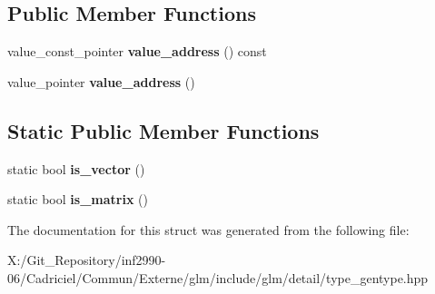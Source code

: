 \subsection*{Public Member Functions}
\begin{DoxyCompactItemize}
\item 
\hypertarget{structglm_1_1detail_1_1gen_type_a63fb77e77082f34c0a0d7faa0906f7f4}{value\-\_\-const\-\_\-pointer {\bfseries value\-\_\-address} () const }\label{structglm_1_1detail_1_1gen_type_a63fb77e77082f34c0a0d7faa0906f7f4}

\item 
\hypertarget{structglm_1_1detail_1_1gen_type_a146973ec142766743080c1895a9e3c65}{value\-\_\-pointer {\bfseries value\-\_\-address} ()}\label{structglm_1_1detail_1_1gen_type_a146973ec142766743080c1895a9e3c65}

\end{DoxyCompactItemize}
\subsection*{Static Public Member Functions}
\begin{DoxyCompactItemize}
\item 
\hypertarget{structglm_1_1detail_1_1gen_type_ae83087df55201bdc46a37decf3d1c34c}{static bool {\bfseries is\-\_\-vector} ()}\label{structglm_1_1detail_1_1gen_type_ae83087df55201bdc46a37decf3d1c34c}

\item 
\hypertarget{structglm_1_1detail_1_1gen_type_a78c650375558d5e2ccfba383cdb59479}{static bool {\bfseries is\-\_\-matrix} ()}\label{structglm_1_1detail_1_1gen_type_a78c650375558d5e2ccfba383cdb59479}

\end{DoxyCompactItemize}


The documentation for this struct was generated from the following file\-:\begin{DoxyCompactItemize}
\item 
X\-:/\-Git\-\_\-\-Repository/inf2990-\/06/\-Cadriciel/\-Commun/\-Externe/glm/include/glm/detail/type\-\_\-gentype.\-hpp\end{DoxyCompactItemize}
